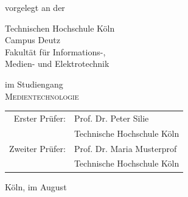 \begin{titlepage}
\begin{center}
\vspace{1.2cm}


\vspace{0.6cm}

\begin{large}
vorgelegt an der\\ 
\vspace{0.2cm}
\begin{scshape}
Technischen Hochschule Köln\\
Campus Deutz\\
Fakultät für Informations-,\\
Medien- und Elektrotechnik\\

\end{scshape}
\end{large}

\vspace{0.6cm}

\begin{large}
im Studiengang\\ 
\vspace{0.1cm}
\textsc{Medientechnologie}
\end{large}


\vspace{1.2cm}

\begin{tabular}{rl}
        Erster Prüfer:  &  Prof. Dr. Peter Silie\\
       					&  \small Technische Hochschule Köln \\[1.0em]
       Zweiter Prüfer:  &  Prof. Dr. Maria Musterprof\\
       					&  \small Technische Hochschule Köln\\
\end{tabular}

\vspace{1.2cm}

\begin{large}
Köln, im August \the\year
\end{large}


\end{center}
\end{titlepage}
